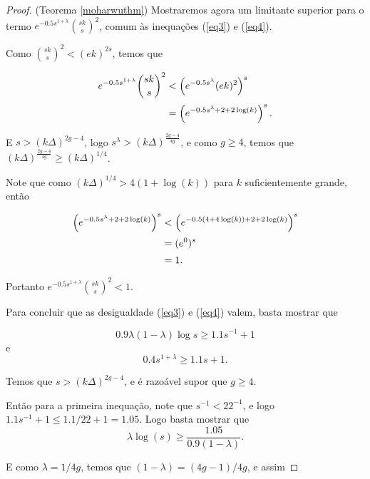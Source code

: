 \begin{proof}{(Teorema \ref{moharwuthm})}
Mostraremos agora um limitante superior para o termo $e^{-0.5s^{1+\lambda}}\binom{sk}{s}^2$, comum às inequações (\ref{eq3}) e (\ref{eq4}).

Como $\binom{sk}{s}^2 < (ek)^{2s}$, temos que

\begin{equation*}
\setlength{\jot}{5pt}
\begin{aligned}
e^{-0.5s^{1+\lambda}}\binom{sk}{s}^2 &< \left(e^{-0.5s^{\lambda}}(ek)^2\right)^s\\
&= \left(e^{-0.5s^\lambda + 2 + 2\log(k)}\right)^s.
\end{aligned}
\end{equation*}

E $s > (k\Delta)^{2g-4}$, logo $s^\lambda > (k\Delta)^{\frac{2g-4}{4g}}$, e como $g \geq 4$, temos que $(k\Delta)^{\frac{2g-4}{4g}} \geq (k\Delta)^{1/4}$. 

Note que como $(k\Delta)^{1/4} > 4(1+\log(k))$ para $k$ suficientemente grande, então

\begin{equation*}
\setlength{\jot}{5pt}
\begin{aligned}
\left(e^{-0.5s^\lambda + 2 + 2\log(k)}\right)^s &< \left(e^{-0.5(4+4\log(k)) + 2 + 2\log(k)}\right)^s\\ 
&= (e^0)^s \\
&= 1.
\end{aligned}
\end{equation*}

Portanto $e^{-0.5s^{1+\lambda}}\binom{sk}{s}^2 < 1$.

Para concluir que as desigualdade (\ref{eq3}) e (\ref{eq4}) valem, basta mostrar que

\[0.9\lambda(1-\lambda)\log s \geq 1.1s^{-1} + 1\]
e
\[0.4s^{1+\lambda}\geq 1.1s + 1.\]


Temos que $s>(k\Delta)^{2g-4}$, e é razoável supor que $g \geq 4$. 

Então para a primeira inequação, note que $s^{-1} < 22^{-1}$, e logo $1.1s^{-1}+1 \leq 1.1/22+1 = 1.05$. Logo basta mostrar que \[\lambda\log(s) \geq \frac{1.05}{0.9(1-\lambda)}.\]

E como $\lambda = 1/4g$, temos que $(1-\lambda) = (4g-1)/4g$, e assim


\end{proof}
